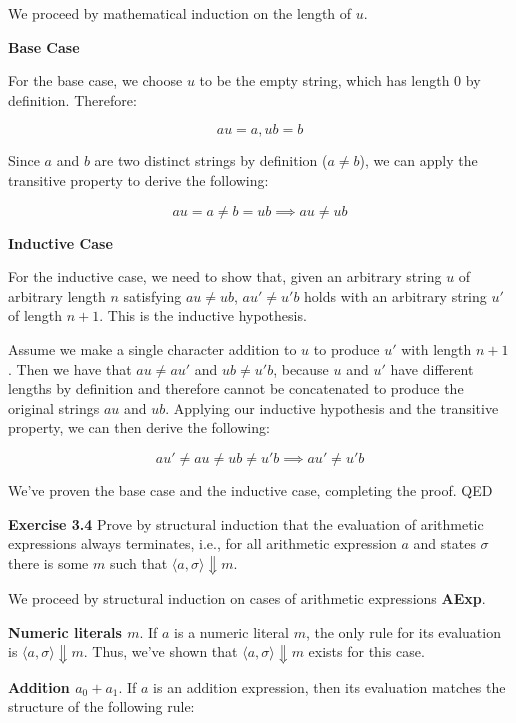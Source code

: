 \documentclass{article}
\begin{document}
  \bigskip
  \noindent We proceed by mathematical induction on the length of $u$.

  \bigskip
  \noindent \textbf{Base Case}

  \medskip
  \noindent For the base case, we choose $u$ to be the empty string, which has length 0 by definition. Therefore:
  
  $$
  au = a, ub = b
  $$
  
  \medskip
  \noindent Since $a$ and $b$ are two distinct strings by definition ($a \neq b$), we can apply the transitive property to derive the following:

  $$
  au = a \neq b = ub \implies au \neq ub
  $$

  \bigskip
  \noindent \textbf{Inductive Case}

  \medskip
  \noindent For the inductive case, we need to show that, given an arbitrary string $u$ of arbitrary length $n$ satisfying $au \neq ub$, $au' \neq u'b$ holds with an arbitrary string $u'$ of length $n + 1$. This is the inductive hypothesis.

  \medskip
  \noindent Assume we make a single character addition to $u$ to produce $u'$ with length $n + 1$. Then we have that $au \neq au'$ and $ub \neq u'b$, because $u$ and $u'$ have different lengths by definition and therefore cannot be concatenated to produce the original strings $au$ and $ub$. Applying our inductive hypothesis and the transitive property, we can then derive the following:

  $$
  au' \neq au \neq ub \neq u'b \implies au' \neq u'b
  $$

  \medskip
  \noindent We've proven the base case and the inductive case, completing the proof. QED
  
  \bigskip
  \noindent \textbf{Exercise 3.4} Prove by structural induction that the evaluation of arithmetic expressions always terminates, i.e., for all arithmetic expression $a$ and states $\sigma$ there is some $m$ such that $\langle a, \sigma \rangle \Downarrow m$.

  \medskip
  \noindent We proceed by structural induction on cases of arithmetic expressions \textbf{AExp}.

  \medskip
  \noindent \textbf{Numeric literals $m$}. If $a$ is a numeric literal $m$, the only rule for its evaluation is $\langle a, \sigma \rangle \Downarrow m$. Thus, we've shown that $\langle a, \sigma \rangle \Downarrow m$ exists for this case.

  \medskip
  \noindent \textbf{Addition $a_0 + a_1$}. If $a$ is an addition expression, then its evaluation matches the structure of the following rule:
\end{document}
